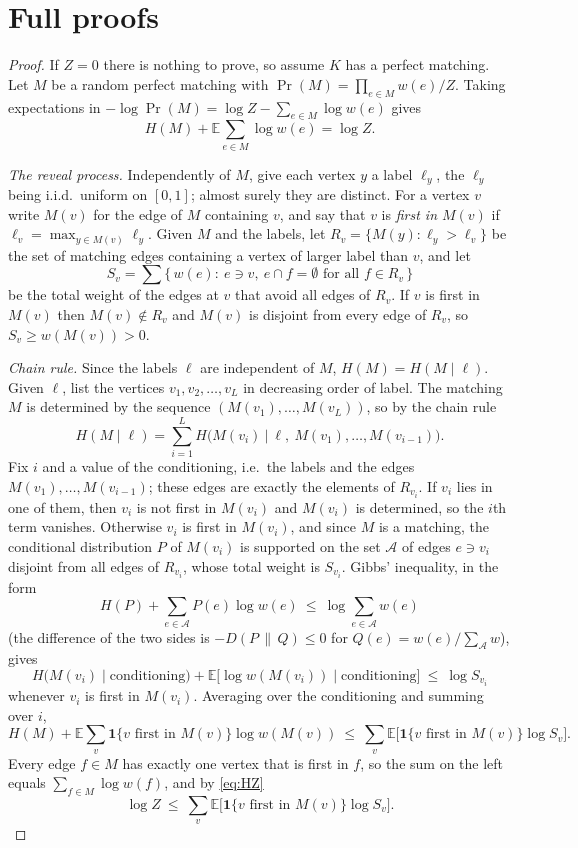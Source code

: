 \documentclass[11pt,a4paper]{article}
\theoremstyle{plain}
\theoremstyle{definition}
\theoremstyle{remark}
\newcommand{\E}{\mathbb E}
\newcommand{\ind}{\mathbf 1}
\begin{document}
\appendix

\section{Full proofs}\label{app:proofs}

\label{pf:pm}
\lemPM*
\begin{proof}
If $Z=0$ there is nothing to prove, so assume $K$ has a perfect matching. Let $M$ be a random perfect matching with $\Pr(M)=\prod_{e\in M}w(e)/Z$. Taking expectations in $-\log\Pr(M)=\log Z-\sum_{e\in M}\log w(e)$ gives
\begin{equation}\label{eq:HZ}
H(M)+\E\sum_{e\in M}\log w(e)=\log Z .
\end{equation}

\emph{The reveal process.} Independently of $M$, give each vertex $y$ a label $\ell_y$, the $\ell_y$ being i.i.d.\ uniform on $[0,1]$; almost surely they are distinct. For a vertex $v$ write $M(v)$ for the edge of $M$ containing $v$, and say that $v$ is \emph{first in $M(v)$} if $\ell_v=\max_{y\in M(v)}\ell_y$. Given $M$ and the labels, let $R_v=\{M(y):\ell_y>\ell_v\}$ be the set of matching edges containing a vertex of larger label than $v$, and let
\[
S_v=\sum\{\,w(e):\ e\ni v,\ e\cap f=\emptyset\text{ for all }f\in R_v\,\}
\]
be the total weight of the edges at $v$ that avoid all edges of $R_v$. If $v$ is first in $M(v)$ then $M(v)\notin R_v$ and $M(v)$ is disjoint from every edge of $R_v$, so $S_v\ge w(M(v))>0$.

\emph{Chain rule.} Since the labels $\ell$ are independent of $M$, $H(M)=H(M\mid\ell)$. Given $\ell$, list the vertices $v_1,v_2,\dots,v_L$ in decreasing order of label. The matching $M$ is determined by the sequence $(M(v_1),\dots,M(v_L))$, so by the chain rule
\[
H(M\mid\ell)=\sum_{i=1}^L H\bigl(M(v_i)\ \big|\ \ell,\ M(v_1),\dots,M(v_{i-1})\bigr).
\]
Fix $i$ and a value of the conditioning, i.e.\ the labels and the edges $M(v_1),\dots,M(v_{i-1})$; these edges are exactly the elements of $R_{v_i}$. If $v_i$ lies in one of them, then $v_i$ is not first in $M(v_i)$ and $M(v_i)$ is determined, so the $i$th term vanishes. Otherwise $v_i$ is first in $M(v_i)$, and since $M$ is a matching, the conditional distribution $P$ of $M(v_i)$ is supported on the set $\mathcal A$ of edges $e\ni v_i$ disjoint from all edges of $R_{v_i}$, whose total weight is $S_{v_i}$. Gibbs' inequality, in the form
\[
H(P)+\sum_{e\in\mathcal A}P(e)\log w(e)\ \le\ \log\sum_{e\in\mathcal A}w(e)
\]
(the difference of the two sides is $-D(P\,\|\,Q)\le0$ for $Q(e)=w(e)/\sum_{\mathcal A}w$), gives
\[
H\bigl(M(v_i)\mid\text{conditioning}\bigr)+\E\bigl[\log w(M(v_i))\mid\text{conditioning}\bigr]\ \le\ \log S_{v_i}
\]
whenever $v_i$ is first in $M(v_i)$. Averaging over the conditioning and summing over $i$,
\[
H(M)+\E\sum_{v}\ind\{v\text{ first in }M(v)\}\log w(M(v))\ \le\ \sum_v\E\bigl[\ind\{v\text{ first in }M(v)\}\log S_v\bigr].
\]
Every edge $f\in M$ has exactly one vertex that is first in $f$, so the sum on the left equals $\sum_{f\in M}\log w(f)$, and by \eqref{eq:HZ}
\begin{equation}\label{eq:six}
\log Z\ \le\ \sum_v\E\bigl[\ind\{v\text{ first in }M(v)\}\log S_v\bigr].
\end{equation}


\end{proof}
\end{document}
